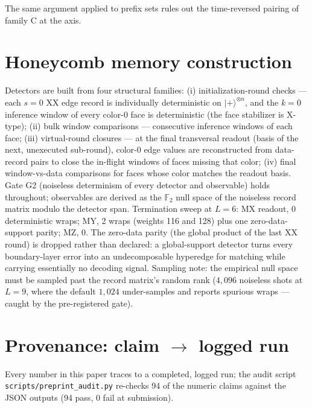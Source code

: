 \documentclass[11pt]{article}
\newcommand{\F}{\mathbb{F}}
\begin{document}
\smallskip
The same argument applied to prefix sets rules out the time-reversed
pairing of family C at the axis.

\section{Honeycomb memory construction}
\label{app:construction}

Detectors are built from four structural families: (i) initialization-round
checks --- each $s = 0$ XX edge record is individually deterministic on
$|+\rangle^{\otimes n}$, and the $k = 0$ inference window of every color-0
face is deterministic (the face stabilizer is X-type); (ii) bulk window
comparisons --- consecutive inference windows of each face; (iii)
virtual-round closures --- at the final transversal readout (basis of the
next, unexecuted sub-round), color-0 edge values are reconstructed from
data-record pairs to close the in-flight windows of faces missing that
color; (iv) final window-vs-data comparisons for faces whose color matches
the readout basis. Gate G2 (noiseless determinism of every detector and
observable) holds throughout; observables are derived as the $\F_2$ null
space of the noiseless record matrix modulo the detector span. Termination
sweep at $L = 6$: MX readout, 0 deterministic wraps; MY, 2 wraps (weights
116 and 128) plus one zero-data-support parity; MZ, 0. The zero-data parity
(the global product of the last XX round) is dropped rather than declared:
a global-support detector turns every boundary-layer error into an
undecomposable hyperedge for matching while carrying essentially no
decoding signal. Sampling note: the empirical null space must be sampled
past the record matrix's random rank ($4{,}096$ noiseless shots at
$L = 9$, where the default $1{,}024$ under-samples and reports spurious
wraps --- caught by the pre-registered gate).

\section{Provenance: claim $\to$ logged run}
\label{app:provenance}

Every number in this paper traces to a completed, logged run; the audit
script \texttt{scripts/preprint\_audit.py} re-checks 94 of the numeric
claims against the JSON outputs (94 pass, 0 fail at submission).
\end{document}
